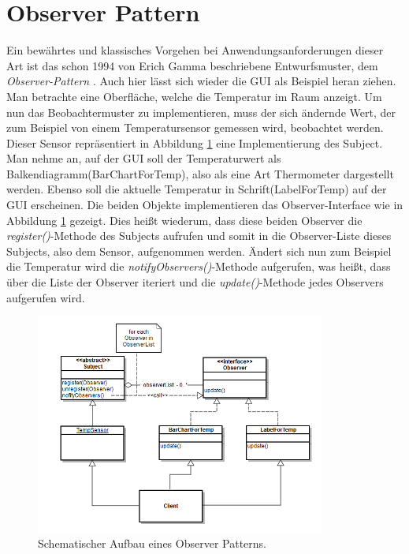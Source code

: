 \section{Observer Pattern}
Ein bewährtes und klassisches Vorgehen bei Anwendungsanforderungen dieser Art ist das schon 1994 von Erich Gamma beschriebene Entwurfsmuster, dem \textit{Observer-Pattern} \cite{Gamma.2011}. Auch hier lässt sich wieder die GUI als Beispiel heran ziehen. Man betrachte eine Oberfläche, welche die Temperatur im Raum anzeigt. Um nun das Beobachtermuster zu implementieren, muss der sich ändernde Wert, der zum Beispiel von einem Temperatursensor gemessen wird, beobachtet werden. Dieser Sensor repräsentiert in Abbildung \ref{pic:observerpattern} eine Implementierung des Subject. Man nehme an, auf der GUI soll der Temperaturwert als Balkendiagramm(BarChartForTemp), also als eine Art Thermometer dargestellt werden. Ebenso soll die aktuelle Temperatur in Schrift(LabelForTemp) auf der GUI erscheinen. Die beiden Objekte implementieren das Observer-Interface wie in Abbildung \ref{pic:observerpattern} gezeigt. Dies heißt wiederum, dass diese beiden Observer die \textit{register()}-Methode des Subjects aufrufen und somit in die Observer-Liste dieses Subjects, also dem Sensor, aufgenommen werden. Ändert sich nun zum Beispiel die Temperatur wird die \textit{notifyObservers()}-Methode aufgerufen, was heißt, dass über die Liste der Observer iteriert und die \textit{update()}-Methode jedes Observers aufgerufen wird.
\begin{figure}[hbt]
	\centering
	\includegraphics[width=0.85\textwidth]{Abb/observerpattern_self}
	\caption{Schematischer Aufbau eines Observer Patterns.}
	\label{pic:observerpattern}
\end{figure}

